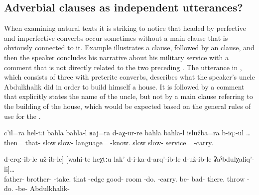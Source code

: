 \subsection{Adverbial clauses as independent utterances?}
\label{ssec:Adverbial clauses as independent utterances}

When examining natural texts it is striking to notice that  headed by perfective and imperfective converbs occur sometimes without a main clause that is obviously connected to it. Example  illustrates a  clause, followed by an  clause, and then the speaker concludes his narrative about his military service with a comment that is not directly related to the two preceding . The utterance in , which consists of three  with preterite converbs, describes what the speaker's uncle Abdulkhalik did in order to build himself a house. It is followed by a comment that explicitly states the name of the uncle, but not by a main clause referring to the building of the house, which would be expected based on the general rules of use for the .
%
\begin{exe}
	\ex	\label{ex:‎‎Then slowly I learned the language and I did my (military) service}
	\gll	c'il=ra	hel-tːi	bahla		bahla-l	ʁaj=ra	d-aχ-ur-re		bahla		bahla-l	islužba=ra b-iqː-ul \ldots\\
		then=		that-	slow		slow-	language=	-know.	slow	slow-	service= -carry.\\
	\glt	{} 

\ex	\label{ex:‎‎The brother of my father (= Abdulkhalik) tore down the wall}
\gll [di-la	atːa-la	ucːi-l	ha-b-ertː-ib-le	il	b-aʔ]		[ʡaˁħ-te	[cin-na	taχna	b-arq'-ij]	d-erqː-ib-le	už-ib-le]		[wahi-te	heχtːu	lak'	d-i-ka-d-arq'-ib-le	d-už-ib-le	ʡaˁbdulχaliq'-li]\ldots \\
	father-	brother-	-take.	that	-edge	good- 		room	-do.	-carry.	be-		bad- 	there.	throw	-do.	-be-	Abdulkhalik- \\
\glt	{}

\end{exe}

